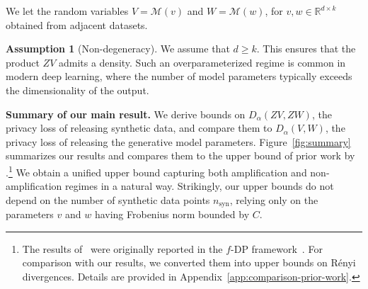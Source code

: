 \documentclass{article}
\theoremstyle{plain}
\theoremstyle{definition}
\newtheorem{assumption}[theorem]{Assumption}
\theoremstyle{remark}
\begin{document}
 We let the random variables $V = \mathcal{M}(v)$ and $W = \mathcal{M}(w)$, for $v,w \in \mathbb{R}^{d \times k}$ obtained from adjacent datasets. 

\begin{assumption}[Non-degeneracy]
We assume that $d \geq k$. This ensures that the product $ZV$ admits a density. Such an overparameterized regime is common in modern deep learning, where the number of model parameters typically exceeds the dimensionality of the output.
\end{assumption}


\textbf{Summary of our main result.} We derive bounds on $D_\alpha(ZV,ZW)$, the privacy loss of releasing synthetic data, and compare them to $D_\alpha(V,W)$, the privacy loss of releasing the generative model parameters. 
Figure~\ref{fig:summary} summarizes our results and compares them to the upper bound of prior work by \citet{pierquin2025}.\footnote{The results of~\citet{pierquin2025} were originally reported in
the $f$-DP framework~\citep{Dong2019}. For comparison with our results, we converted them into upper bounds on Rényi divergences. Details are provided in Appendix~\ref{app:comparison-prior-work}.} We obtain a unified upper bound capturing both amplification and non-amplification regimes in a natural way. Strikingly, our upper bounds do not depend on the number of synthetic data points $n_{\text{syn}}$, relying only on the parameters $v$ and $w$ having Frobenius norm bounded by $C$.
\end{document}
